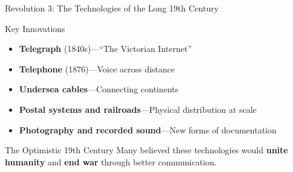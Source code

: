 \documentclass[aspectratio=169,11pt]{beamer}
\begin{document}
\begin{frame}{Revolution 3: The Technologies of the Long 19th Century}
\begin{block}{Key Innovations}
\begin{itemize}
  \item \textbf{Telegraph} (1840s)---``The Victorian Internet''
  \item \textbf{Telephone} (1876)---Voice across distance
  \item \textbf{Undersea cables}---Connecting continents
  \item \textbf{Postal systems and railroads}---Physical distribution at scale
  \item \textbf{Photography and recorded sound}---New forms of documentation
\end{itemize}
\end{block}

\vspace{0.3em}
\begin{exampleblock}{The Optimistic 19th Century}
Many believed these technologies would \textbf{unite humanity} and \textbf{end war} through better communication.
\end{exampleblock}
\end{frame}
\end{document}
